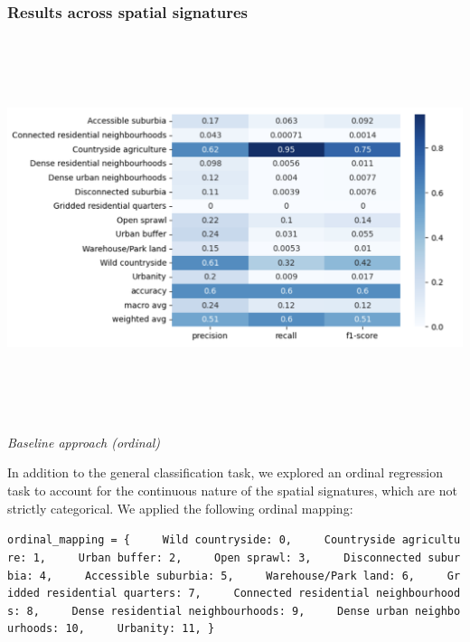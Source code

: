 \documentclass[
  letterpaper,
  DIV=11,
  numbers=noendperiod]{scrartcl}
\begin{document}
\subsubsection{Results across spatial
signatures}\label{results-across-spatial-signatures}

\begin{center}
\includegraphics[width=\textwidth,height=4.375in]{../figures/algo_design/baseline_tile_level.png}
\end{center}

\emph{Baseline approach (ordinal)}

In addition to the general classification task, we explored an ordinal
regression task to account for the continuous nature of the spatial
signatures, which are not strictly categorical. We applied the following
ordinal mapping:

\texttt{ordinal\_mapping\ =\ \{\ \ \ \ \ \textquotesingle{}Wild\ countryside\textquotesingle{}:\ 0,\ \ \ \ \ \textquotesingle{}Countryside\ agriculture\textquotesingle{}:\ 1,\ \ \ \ \ \textquotesingle{}Urban\ buffer\textquotesingle{}:\ 2,\ \ \ \ \ \textquotesingle{}Open\ sprawl\textquotesingle{}:\ 3,\ \ \ \ \ \textquotesingle{}Disconnected\ suburbia\textquotesingle{}:\ 4,\ \ \ \ \ \textquotesingle{}Accessible\ suburbia\textquotesingle{}:\ 5,\ \ \ \ \ \textquotesingle{}Warehouse/Park\ land\textquotesingle{}:\ 6,\ \ \ \ \ \textquotesingle{}Gridded\ residential\ quarters\textquotesingle{}:\ 7,\ \ \ \ \ \textquotesingle{}Connected\ residential\ neighbourhoods\textquotesingle{}:\ 8,\ \ \ \ \ \textquotesingle{}Dense\ residential\ neighbourhoods\textquotesingle{}:\ 9,\ \ \ \ \ \textquotesingle{}Dense\ urban\ neighbourhoods\textquotesingle{}:\ 10,\ \ \ \ \ \textquotesingle{}Urbanity\textquotesingle{}:\ 11,\ \}}
\end{document}
